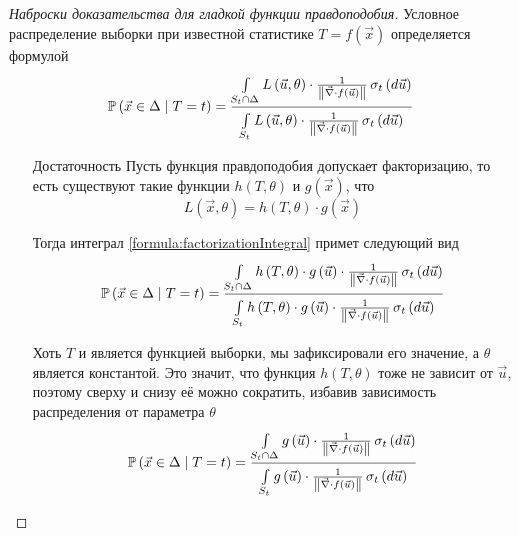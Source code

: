 \begin{proof}[Наброски доказательства для гладкой функции правдоподобия]
  Условное распределение выборки при известной статистике
  $T=f\left( \vec{x} \right)$ определяется формулой
  \begin{equation}\label{formula:factorizationIntegral}
      \probability{\vec{x} \in \Delta \mcond T = t}
      = \frac{\integrall{S_t \cap \Delta}{\sigma_{t}\left(d\vec{u} \right)}{
      L\left( \vec{u}, \theta \right) \cdot \frac{1}{
      \left\| \vec{\nabla} \cdot f\left( \vec{u} \right) \right\|}}}
      {\integrall{S_t}{\sigma_{t}\left(d\vec{u} \right)}{
      L\left( \vec{u}, \theta \right) \cdot \frac{1}{
    \left\| \vec{\nabla}
        \cdot f\left( \vec{u} \right) \right\|}}}
  \end{equation}
  \begin{enumerate}
      \item[Достаточность]
      Пусть функция правдоподобия допускает факторизацию,
      то есть существуют такие функции $h\left( T, \theta \right)$
      и $g\left( \vec{x} \right)$, что
      $$L\left( \vec{x}, \theta \right)
      = h\left( T, \theta \right) \cdot g\left( \vec{x} \right)$$

      Тогда интеграл \eqref{formula:factorizationIntegral}
      примет следующий вид
      $$\probability{\vec{x} \in \Delta \mcond T = t}
      = \frac{\integrall{S_t \cap \Delta}{
    \sigma_{t}\left(d\vec{u} \right)}{
        h\left( T, \theta \right) \cdot g\left( \vec{u} \right)
    \cdot \frac{1}{\left\| \vec{\nabla}
        \cdot f\left( \vec{u} \right) \right\|}}}
    {\integrall{S_t}{\sigma_{t}\left(d\vec{u} \right)}{
        h\left( T, \theta \right) \cdot g\left( \vec{u} \right)
    \cdot \frac{1}{\left\| \vec{\nabla}
        \cdot f\left( \vec{u} \right) \right\|}}}$$

      Хоть $T$ и является функцией выборки, мы зафиксировали его значение,
      а $\theta$ является константой.
      Это значит, что функция $h\left( T, \theta \right)$ тоже не зависит
      от $\vec{u}$, поэтому сверху и снизу её можно сократить, избавив
      зависимость распределения от параметра $\theta$
      $$\probability{\vec{x} \in \Delta \mcond T = t}
      = \frac{\integrall{S_t \cap \Delta}{
    \sigma_{t}\left(d\vec{u} \right)}{
        g\left( \vec{u} \right)
    \cdot \frac{1}{\left\| \vec{\nabla}
        \cdot f\left( \vec{u} \right) \right\|}}}
    {\integrall{S_t}{\sigma_{t}\left(d\vec{u} \right)}{
        g\left( \vec{u} \right)
    \cdot \frac{1}{\left\| \vec{\nabla}
        \cdot f\left( \vec{u} \right) \right\|}}}$$


\end{enumerate}
\end{proof}
